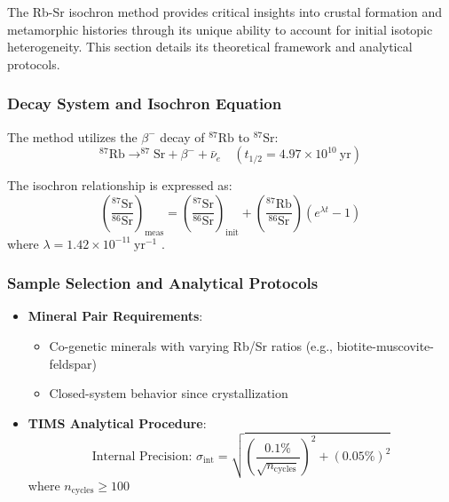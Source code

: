 \documentclass{article}
\begin{document}
The Rb-Sr isochron method provides critical insights into crustal formation and metamorphic histories through its unique ability to account for initial isotopic heterogeneity. This section details its theoretical framework and analytical protocols.

\subsubsection*{Decay System and Isochron Equation}
The method utilizes the \(\beta^-\) decay of \(^{87}\text{Rb}\) to \(^{87}\text{Sr}\):
\begin{equation}
    ^{87}\text{Rb} \rightarrow ^{87}\text{Sr} + \beta^- + \bar{\nu}_e \quad (t_{1/2} = 4.97 \times 10^{10}\ \text{yr})
    \label{eq:rb_decay}
\end{equation}

The isochron relationship is expressed as:
\begin{equation}
    \left(\frac{^{87}\text{Sr}}{^{86}\text{Sr}}\right)_{\text{meas}} = \left(\frac{^{87}\text{Sr}}{^{86}\text{Sr}}\right)_{\text{init}} + \left(\frac{^{87}\text{Rb}}{^{86}\text{Sr}}\right)(e^{\lambda t} - 1)
    \label{eq:isochron}
\end{equation}
where \(\lambda = 1.42 \times 10^{-11}\ \text{yr}^{-1}\) \cite{Steiger1977}.

\subsubsection*{Sample Selection and Analytical Protocols}
\begin{itemize}
    \item \textbf{Mineral Pair Requirements}:
    \begin{itemize}
        \item Co-genetic minerals with varying Rb/Sr ratios (e.g., biotite-muscovite-feldspar)
        \item Closed-system behavior since crystallization
    \end{itemize}
    
    \item \textbf{TIMS Analytical Procedure}:
    \begin{equation}
        \text{Internal Precision: } \sigma_{\text{int}} = \sqrt{\left(\frac{0.1\%}{\sqrt{n_{\text{cycles}}}}\right)^2 + (0.05\%)^2}
        \label{eq:tims_precision}
    \end{equation}
    where \(n_{\text{cycles}} \geq 100\) 
\end{itemize}
\end{document}
